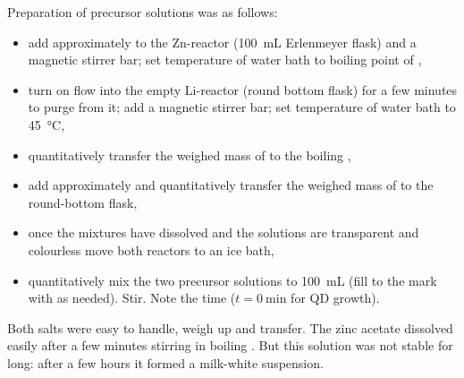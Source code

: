 \documentclass[draft,webedition,openright,titles,swedish,english]{LuaUUThesis}\usepackage[]{graphicx}\usepackage[]{xcolor}
\begin{document}
Preparation of precursor solutions was as follows:
\begin{itemize}[after=\vspace{\baselineskip}]
\item add approximately  to the Zn-reactor (\qty{100}{\mL} Erlenmeyer flask)
      and a magnetic stirrer bar; set temperature of water bath to boiling point of ,
\item turn on  flow into the empty Li-reactor (round bottom flask) for a few minutes
      to purge  from it; add a magnetic stirrer bar;
      set temperature of water bath to \qty{45}{\celsius},
\item quantitatively transfer the weighed mass of  to the boiling ,
\item add approximately  and quantitatively transfer the weighed mass
      of  to the round-bottom flask,
\item once the mixtures have dissolved and the solutions
      are transparent and colourless move both reactors to an ice bath,
\item quantitatively mix the two precursor solutions to \qty{100}{\mL}
      (fill to the mark with  as needed). Stir.
      Note the time ($t=\qty{0}{\minute}$ for \gls{QD} growth).
\end{itemize}

Both salts were easy to handle, weigh up and transfer.
The zinc acetate  dissolved easily after
a few minutes stirring in boiling .
But this solution was not stable for long: after a few hours it formed a milk-white suspension.
\end{document}
